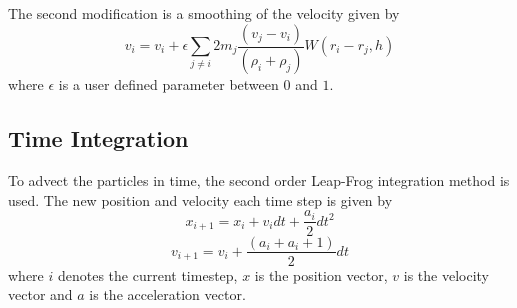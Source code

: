 The second modification is a smoothing of the velocity given by
$$
v_i = v_i + \epsilon \sum_{j \ne i} 2m_j \frac{(v_j - v_i)}{(\rho_i + \rho_j)} W(r_i - r_j, h)
$$
where $\epsilon$ is a user defined parameter between $0$ and $1$.

\subsection{Time Integration}
To advect the particles in time, the second order Leap-Frog integration method
is used. The new position and velocity each time step is given by
$$
x_{i+1} = x_i + v_i dt + \frac{a_i}{2} dt^2
$$
$$
v_{i+1} = v_i + \frac{(a_i + a_i+1)}{2} dt
$$
where $i$ denotes the current timestep, $x$ is the position vector, $v$ is the velocity vector and $a$ is the acceleration vector.

